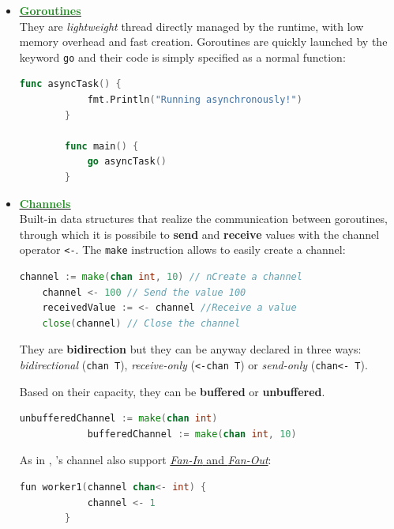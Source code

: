 \begin{itemize}
	\item \underline{\href{https://go.dev/tour/concurrency/1}{\underline{\textbf{\textcolor{ForestGreen}{Goroutines}}}}}\\
	They are \textit{lightweight} thread directly managed by the \Go runtime, with low memory overhead and fast creation. Goroutines are quickly launched by the keyword \texttt{go} and their code is simply specified as a normal function:
	
	\begin{lstlisting}[language=go]
		func asyncTask() {
			fmt.Println("Running asynchronously!")
		}
		
		func main() {
			go asyncTask()
		}
	\end{lstlisting}
	
	\item \underline{\href{https://go.dev/tour/concurrency/2}{\underline{\textbf{\textcolor{ForestGreen}{Channels}}}}}\\
	Built-in data structures that realize the communication between goroutines, through which it is possibile to \textbf{send} and \textbf{receive} values with the channel operator \texttt{<-}. The \texttt{make} instruction allows to easily create a channel:\\
	
	\begin{lstlisting}[language=go]
	channel := make(chan int, 10) // nCreate a channel
	channel <- 100 // Send the value 100
	receivedValue := <- channel //Receive a value
	close(channel) // Close the channel
	\end{lstlisting}
	
	They are \textbf{bidirection} but they can be anyway declared in three ways: \textit{bidirectional} (\texttt{chan T}), \textit{receive-only} (\texttt{<-chan T}) or \textit{send-only} (\texttt{chan<- T}). 
	
	Based on their capacity, they can be \textbf{buffered} or \textbf{unbuffered}.
		\begin{lstlisting}[language=go]
			unbufferedChannel := make(chan int)
			bufferedChannel := make(chan int, 10)
	\end{lstlisting}
	
	As in \Kotlin , \Go 's channel also support \href{https://kapoorrahul.medium.com/golang-fan-in-fan-out-concurrency-pattern-f5a29ff1f93b}{\textit{Fan-In} and \textit{Fan-Out}}:
	\begin{lstlisting}[language=go]
		fun worker1(channel chan<- int) {
			channel <- 1
		}
		

\end{lstlisting}
\end{itemize}

